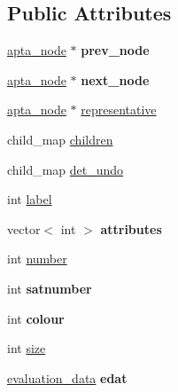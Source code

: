 \subsection*{Public Attributes}
\begin{DoxyCompactItemize}
\item 
\hyperlink{classapta__node}{apta\+\_\+node} $\ast$ {\bfseries prev\+\_\+node}\hypertarget{classapta__node_a9376765aa0bd23aef5601fc7d87fefd6}{}\label{classapta__node_a9376765aa0bd23aef5601fc7d87fefd6}

\item 
\hyperlink{classapta__node}{apta\+\_\+node} $\ast$ {\bfseries next\+\_\+node}\hypertarget{classapta__node_a36b2c6768be3b9943404f0bf49740fd8}{}\label{classapta__node_a36b2c6768be3b9943404f0bf49740fd8}

\item 
\hyperlink{classapta__node}{apta\+\_\+node} $\ast$ \hyperlink{classapta__node_aa2947d27209a9befd6458060419b2f43}{representative}
\item 
child\+\_\+map \hyperlink{classapta__node_a04c0ef7f20669b97f2c5c65edc4c044c}{children}
\item 
child\+\_\+map \hyperlink{classapta__node_a73996ef299e0ed3fdef53b68f6dc2204}{det\+\_\+undo}
\item 
int \hyperlink{classapta__node_aaba8e9487f1161584177a708aa700bea}{label}
\item 
vector$<$ int $>$ {\bfseries attributes}\hypertarget{classapta__node_a4e046e51b80d77ab7c22e01069e2998d}{}\label{classapta__node_a4e046e51b80d77ab7c22e01069e2998d}

\item 
int \hyperlink{classapta__node_aa4d8ad2056671f1e14ddb4123ac6f87e}{number}
\item 
int {\bfseries satnumber}\hypertarget{classapta__node_adb2ae7e0890e5421c29ab7f67628f699}{}\label{classapta__node_adb2ae7e0890e5421c29ab7f67628f699}

\item 
int {\bfseries colour}\hypertarget{classapta__node_a71d29ce9c86f145bd4854a5262d73829}{}\label{classapta__node_a71d29ce9c86f145bd4854a5262d73829}

\item 
int \hyperlink{classapta__node_a24c9dae152b759bb6a2ebcae6bbc36d5}{size}
\item 
\hyperlink{classevaluation__data}{evaluation\+\_\+data} {\bfseries edat}\hypertarget{classapta__node_a0104418ee2337dd0cbf6a5a50d486afe}{}\label{classapta__node_a0104418ee2337dd0cbf6a5a50d486afe}


\end{DoxyCompactItemize}

